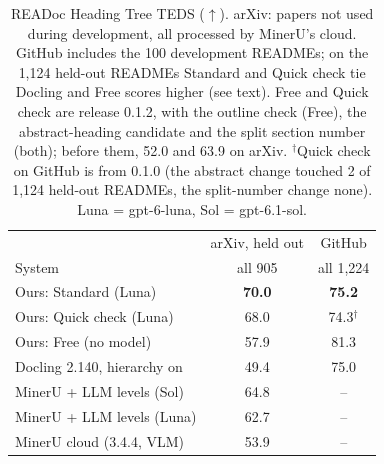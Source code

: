 \documentclass[10pt,twocolumn,letterpaper]{article}
\newcommand{\na}{--}
\begin{document}
\begin{table}[t]
\centering
\footnotesize
\setlength{\tabcolsep}{4pt}
\begin{tabular}{@{}lcc@{}}
\toprule
 & arXiv, held out & GitHub \\
System & all 905 & all 1,224 \\
\midrule
Ours: Standard (Luna)        & \textbf{70.0} & \textbf{75.2} \\
Ours: Quick check (Luna)     & 68.0 & 74.3$^{\dagger}$ \\
Ours: Free (no model)        & 57.9 & 81.3 \\
Docling 2.140, hierarchy on  & 49.4 & 75.0 \\
MinerU + LLM levels (Sol)    & 64.8 & \na \\
MinerU + LLM levels (Luna)   & 62.7 & \na \\
MinerU cloud (3.4.4, VLM)    & 53.9 & \na \\
\bottomrule
\end{tabular}
\caption{READoc Heading Tree TEDS ($\uparrow$). arXiv: papers not used during development, all
processed by MinerU's cloud. GitHub includes the 100 development READMEs; on the
1,124 held-out READMEs Standard and Quick check tie Docling and Free scores higher (see text). Free and Quick
check are release 0.1.2, with the outline check (Free), the abstract-heading candidate and the split
section number (both); before them, 52.0 and 63.9 on arXiv. $^{\dagger}$Quick check on GitHub is from
0.1.0 (the abstract change touched 2 of 1,124 held-out READMEs, the split-number change none). Luna =
gpt-6-luna, Sol = gpt-6.1-sol.}
\label{tab:readoc}
\end{table}
\end{document}

